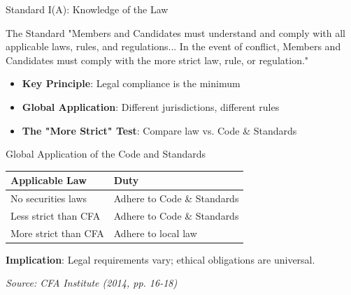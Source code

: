 \documentclass{beamer}
\begin{document}
	\begin{frame}{Standard I(A): Knowledge of the Law}
		\begin{block}{The Standard}
			"Members and Candidates must understand and comply with all applicable laws, rules, and regulations... In the event of conflict, Members and Candidates must comply with the more strict law, rule, or regulation."
		\end{block}
		
		\begin{itemize}
			\item \textbf{Key Principle}: Legal compliance is the \textcolor{cfablue}{minimum}
			\item \textbf{Global Application}: Different jurisdictions, different rules
			\item \textbf{The "More Strict" Test}: Compare law vs. Code \& Standards
		\end{itemize}
		
		\vspace{0.3cm}
		\begin{center}
		\end{center}
	\end{frame}
	
	\begin{frame}{Global Application of the Code and Standards}
		\begin{table}[]
			\centering
			\small
			\begin{tabular}{|p{3.2cm}|p{3.5cm}|}
				\hline
				\textbf{Applicable Law} & \textbf{Duty} \\
				\hline
				No securities laws & Adhere to Code \& Standards \\
				Less strict than CFA & Adhere to Code \& Standards \\
				More strict than CFA & Adhere to local law \\
				\hline
			\end{tabular}
		\end{table}
		
		\vspace{0.3cm}
		\textbf{Implication}: Legal requirements vary; ethical obligations are universal.
		
		\vspace{0.2cm}
		\footnotesize \textit{Source: CFA Institute (2014, pp. 16-18)}
	\end{frame}
	
\end{document}
